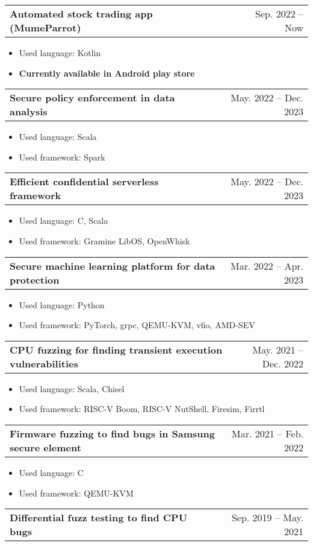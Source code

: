 \documentclass[letterpaper,11pt]{article}
\makeatletter
\newcommand{\resumeItem}[1]{
  \item\small{
    {#1 \vspace{-2pt}}
  }
}
\newcommand{\resumeProjectHeading}[2]{
    \item
    \begin{tabular*}{0.97\textwidth}[t]{l@{\extracolsep{\fill}}r}
      \textbf{#1} & #2
    \end{tabular*}\vspace{-7pt}
}
\newcommand{\resumeItemListStart}{\begin{itemize}}
\newcommand{\resumeItemListEnd}{\end{itemize}\vspace{-5pt}}
\makeatother
\begin{document}
      \resumeProjectHeading
          {\textbf{Automated stock trading app (MumeParrot)}}
          {Sep. 2022 -- Now}

        \resumeItemListStart
            \resumeItem
                {Used language: Kotlin}
            \resumeItem
                {\textbf{Currently available in Android play store}}
        \resumeItemListEnd

      \resumeProjectHeading
          {\textbf{Secure policy enforcement in data analysis}}
          {May. 2022 -- Dec. 2023}

        \resumeItemListStart
            \resumeItem
                {Used language: Scala}
            \resumeItem
                {Used framework: Spark}
        \resumeItemListEnd

      \resumeProjectHeading
          {\textbf{Efficient confidential serverless framework}}
          {May. 2022 -- Dec. 2023}

        \resumeItemListStart
            \resumeItem
                {Used language: C, Scala}
            \resumeItem
                {Used framework: Gramine LibOS, OpenWhisk}
        \resumeItemListEnd

      \resumeProjectHeading
          {\textbf{Secure machine learning platform for data protection}}
          {Mar. 2022 -- Apr. 2023}

        \resumeItemListStart
            \resumeItem
                {Used language: Python}
            \resumeItem
                {Used framework: PyTorch, grpc, QEMU-KVM, vfio, AMD-SEV}
        \resumeItemListEnd

      \resumeProjectHeading
          {\textbf{CPU fuzzing for finding transient execution vulnerabilities}}
          {May. 2021 -- Dec. 2022}

        \resumeItemListStart
            \resumeItem
                {Used language: Scala, Chisel}
            \resumeItem
                {Used framework: RISC-V Boom, RISC-V NutShell, Firesim, Firrtl}
        \resumeItemListEnd

      \resumeProjectHeading
          {\textbf{Firmware fuzzing to find bugs in Samsung secure element}}
          {Mar. 2021 -- Feb. 2022}

        \resumeItemListStart
            \resumeItem
                {Used language: C}
            \resumeItem
                {Used framework: QEMU-KVM}
        \resumeItemListEnd


      \resumeProjectHeading
          {\textbf{Differential fuzz testing to find CPU bugs}}
          {Sep. 2019 -- May. 2021}
\end{document}
